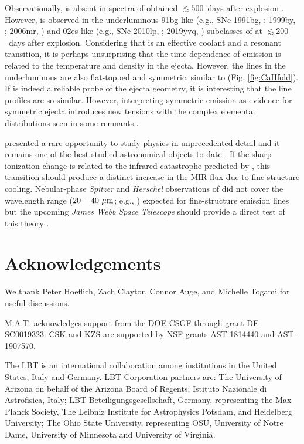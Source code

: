 \documentclass[twocolumn]{aastex63}
\begin{document}
Observationally, \CaII is absent in spectra of \sneia obtained $\lesssim 500$~days after explosion \citep[e.g., ][]{graham2017, maguire2018, flors2018, flors2020}. However, \CaII is observed in the underluminous 91bg-like (e.g., SNe 1991bg, \citealp{turatto1996}; 1999by, \citealp{blondin2018}; 2006mr, \citealp{stritzinger2010}) and 02es-like (e.g., SNe 2010lp, \citealp{taubenberger2013}; 2019yvq, \citealp{siebert2020,tucker2021a,burke2021}) subclasses of \sneia at $\lesssim 200$~days after explosion. Considering that \CaII is an effective coolant and a resonant transition, it is perhaps unsurprising that the time-dependence of \CaII emission is related to the temperature and density in the ejecta. However, the \CaII lines in the underluminous \sneia are also flat-topped and symmetric, similar to \name (Fig. \ref{fig:CaIIfold}). If \CaII is indeed a reliable probe of the ejecta geometry, it is interesting that the \CaII line profiles are so similar. However, interpreting symmetric \CaII emission as evidence for symmetric ejecta introduces new tensions with the complex elemental distributions seen in some \snia remnants \citep[e.g., ][]{stone2021}. 

\name presented a rare opportunity to study \sneia physics in unprecedented detail and it remains one of the best-studied astronomical objects to-date \citep[e.g., ][]{tucker2021c}. If the sharp ionization change is related to the infrared catastrophe predicted by \citet{axelrod1980}, this transition should produce a distinct increase in the MIR flux due to fine-structure cooling. Nebular-phase \textit{Spitzer} and \textit{Herschel} observations of \name \citep{johansson2013, johansson2014} did not cover the wavelength range ($20-40~\mu\rm m$; e.g., \citealp{fransson2015}) expected for fine-structure emission lines but the upcoming \textit{James Webb Space Telescope} should provide a direct test of this theory \citep[e.g., ][]{ashall2021}. 


\section*{Acknowledgements}

We thank Peter Hoeflich, Zach Claytor, Connor Auge, and Michelle Togami for useful discussions. 

M.A.T. acknowledges support from the DOE CSGF through grant DE-SC0019323. CSK and KZS are supported by NSF grants AST-1814440 and AST-1907570.

The LBT is an international collaboration among institutions in the
United States, Italy and Germany. LBT Corporation partners are: The
University of Arizona on behalf of the Arizona Board of Regents;
Istituto Nazionale di Astrofisica, Italy; LBT Beteiligungsgesellschaft,
Germany, representing the Max-Planck Society, The Leibniz Institute for
Astrophysics Potsdam, and Heidelberg University; The Ohio State
University, representing OSU, University of Notre Dame, University of
Minnesota and University of Virginia.
\end{document}
